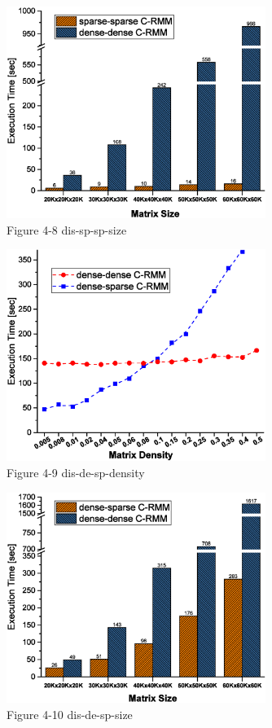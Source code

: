 \documentclass[onecolumn]{ieeetran}
\begin{document}
\begin{figure}[ht]
  \centering\captionsetup{justification=centering}
  \includegraphics[width=0.75\textwidth]{Figure_4-8_dis-sp-sp-size.eps}
  \caption{Figure 4-8 dis-sp-sp-size}\label{Figure_4-8_dis-sp-sp-size}
\end{figure}

\begin{figure}[ht]
  \centering\captionsetup{justification=centering}
  \includegraphics[width=0.75\textwidth]{Figure_4-9_dis-de-sp-density.eps}
  \caption{Figure 4-9 dis-de-sp-density}\label{Figure_4-9_dis-de-sp-density}
\end{figure}

\begin{figure}[ht]
  \centering\captionsetup{justification=centering}
  \includegraphics[width=0.75\textwidth]{Figure_4-10_dis-de-sp-size.eps}
  \caption{Figure 4-10 dis-de-sp-size}\label{Figure_4-10_dis-de-sp-size}
\end{figure}
\end{document}
